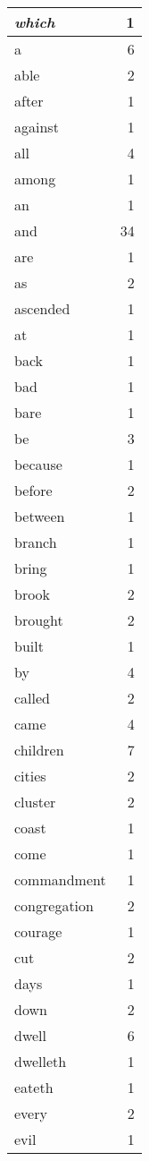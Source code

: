 \begin{center}
\begin{longtable}{l|r}
\emph{which} & 1\\ \hline 
a & 6\\ \hline 
able & 2\\ \hline 
after & 1\\ \hline 
against & 1\\ \hline 
all & 4\\ \hline 
among & 1\\ \hline 
an & 1\\ \hline 
and & 34\\ \hline 
are & 1\\ \hline 
as & 2\\ \hline 
ascended & 1\\ \hline 
at & 1\\ \hline 
back & 1\\ \hline 
bad & 1\\ \hline 
bare & 1\\ \hline 
be & 3\\ \hline 
because & 1\\ \hline 
before & 2\\ \hline 
between & 1\\ \hline 
branch & 1\\ \hline 
bring & 1\\ \hline 
brook & 2\\ \hline 
brought & 2\\ \hline 
built & 1\\ \hline 
by & 4\\ \hline 
called & 2\\ \hline 
came & 4\\ \hline 
children & 7\\ \hline 
cities & 2\\ \hline 
cluster & 2\\ \hline 
coast & 1\\ \hline 
come & 1\\ \hline 
commandment & 1\\ \hline 
congregation & 2\\ \hline 
courage & 1\\ \hline 
cut & 2\\ \hline 
days & 1\\ \hline 
down & 2\\ \hline 
dwell & 6\\ \hline 
dwelleth & 1\\ \hline 
eateth & 1\\ \hline 
every & 2\\ \hline 
evil & 1\\ \hline 

\end{longtable}
\end{center}
